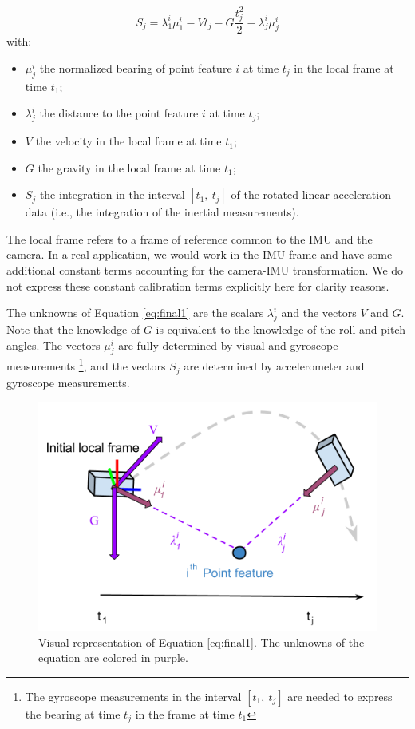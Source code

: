 \documentclass[letterpaper, 10 pt, journal, final]{ieeeconf}  %
\begin{document}
\begin{equation} \label{eq:final1}
S_j = \lambda_1^i\mu_1^i - V t_j - G \frac{t_j^2}{2} - \lambda^i_j \mu^i_j
\end{equation}
\noindent with:
\begin{itemize}
\item $\mu_j^i$ the normalized bearing of point feature $i$ at time $t_j$ in the local frame at time $t_1$;
\item $\lambda_j^i$ the distance to the point feature $i$ at time $t_j$;
\item $V$ the velocity in the local frame at time $t_1$;
\item $G$ the gravity in the local frame  at time $t_1$;
\item $S_j$ the integration in the interval $[t_1, ~t_j]$ of the rotated linear acceleration data (i.e., the integration of the inertial measurements).
\end{itemize}


The local frame refers to a frame of reference common to the IMU and the camera.
In a real application, we would work in the IMU frame and have some additional constant terms
accounting for the camera-IMU transformation.
We do not express these constant calibration terms explicitly here for clarity reasons.

The unknowns of Equation \ref{eq:final1} are the scalars $\lambda_j^i$ and the vectors $V$ and $G$.
Note that the knowledge of $G$ is equivalent to the knowledge of the roll and pitch angles.
The vectors $\mu_j^i$ are fully determined by visual and gyroscope measurements \footnote{The gyroscope measurements in the interval $[t_1, ~t_j]$ are needed to express the bearing at time $t_j$ in the frame at time $t_1$},
and the vectors $S_j$ are determined by accelerometer and gyroscope measurements.

\begin{figure}
  \centering
  \includegraphics[width=0.7\columnwidth, trim={0 2cm 0 0}, clip]{images/closedFormExplained}
  \caption{Visual representation of Equation \ref{eq:final1}.
  The unknowns of the equation are colored in \textcolor{amethyst}{purple}.}
\end{figure}
\end{document}
